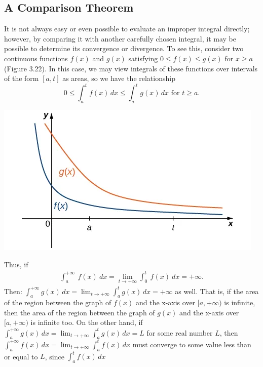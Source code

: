 \documentclass{report}
\begin{document}
        \pagebreak 
        \subsection*{A Comparison Theorem}
        \bigbreak \noindent 
        It is not always easy or even possible to evaluate an improper integral directly; however, by comparing it with another carefully chosen integral, it may be possible to determine its convergence or divergence. To see this, consider two continuous functions $f(x)$ and $g(x)$ satisfying $0 \leq f(x) \leq g(x)$ for $x \geq a$ (Figure 3.22). In this case, we may view integrals of these functions over intervals of the form $[a,t]$ as areas, so we have the relationship
        \[ 0 \leq \int_a^t f(x) \, dx \leq \int_a^t g(x) \, dx \text{ for } t \geq a. \]
        \bigbreak \noindent 
        \begin{center}
            \includegraphics[scale=0.5]{./figures/mane5.png}
        \end{center}
        \bigbreak \noindent 
        Thus, if
        \begin{align*}
            \int_{a}^{+\infty}\ f(x)\ dx = \lim\limits_{t \to +\infty}{\int_{0}^{t}\ f(x)\ dx} = +\infty
        .\end{align*}
        Then:
        $\int_a^{+\infty} g(x) \, dx = \lim_{t \to +\infty} \int_a^t g(x) \, dx = +\infty$ as well. That is, if the area of the region between the graph of $f(x)$ and the x-axis over $[a,+\infty)$ is infinite, then the area of the region between the graph of $g(x)$ and the x-axis over $[a,+\infty)$ is infinite too.
        On the other hand, if
        \bigbreak \noindent 
        $\int_a^{+\infty} g(x) \, dx = \lim_{t \to +\infty} \int_a^t g(x) \, dx = L$ for some real number $L$, then $\int_a^{+\infty} f(x) \, dx = \lim_{t \to +\infty} \int_a^t f(x) \, dx$ must converge to some value less than or equal to $L$, since $\int_a^t f(x) \, dx$
\end{document}
